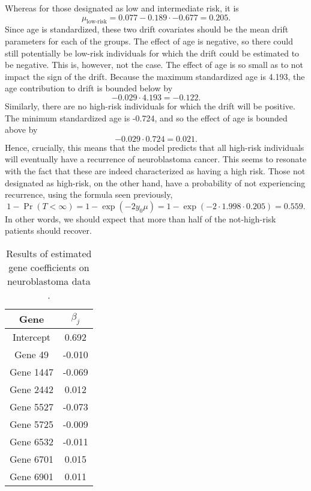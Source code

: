 Whereas for those designated as low and intermediate risk, it is
\begin{equation}
    \mu_{\text{low-risk}}=0.077-0.189\cdot-0.677=0.205.
\end{equation}
Since age is standardized, these two drift covariates should be the mean drift parameters for each of the groups.
The effect of age is negative, so there could still potentially be low-risk individuals for which the drift could be estimated to be negative.
This is, however, not the case.
The effect of age is so small as to not impact the sign of the drift.
Because the maximum standardized age is 4.193, the age contribution to drift is bounded below by 
\begin{equation*}
    -0.029\cdot4.193=-0.122.
\end{equation*}
Similarly, there are no high-risk individuals for which the drift will be positive.
The minimum standardized age is -0.724, and so the effect of age is bounded above by
\begin{equation*}
    -0.029\cdot0.724=0.021.
\end{equation*}
Hence, crucially, this means that the model predicts that all high-risk individuals will eventually have a recurrence of neuroblastoma cancer.
This seems to resonate with the fact that these are indeed characterized as having a high risk.
Those not designated as high-risk, on the other hand, have a probability of not experiencing recurrence, using the formula seen previously,
\begin{equation*}
    1-\Pr{(T<\infty)}=1-\exp{(-2y_0\mu)}=1-\exp{(-2\cdot 1.998\cdot 0.205)}=0.559.
\end{equation*}
In other words, we should expect that more than half of the not-high-risk patients should recover.


\begin{table}
\caption{Results of estimated gene coefficients on neuroblastoma data \citep{oberthuer-data}.}
\label{tab:oberthuer-beta}
\centering
\begin{tabular}{cc}
\toprule
Gene      & $\beta_j$ \\
\hline
Intercept &  0.692    \\
Gene 49   & -0.010    \\
Gene 1447 & -0.069    \\
Gene 2442 &  0.012    \\
Gene 5527 & -0.073    \\
Gene 5725 & -0.009    \\
Gene 6532 & -0.011    \\
Gene 6701 &  0.015    \\
Gene 6901 &  0.011    \\
\bottomrule
\end{tabular}
\end{table}

